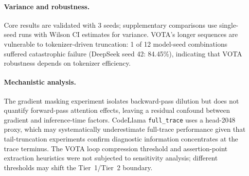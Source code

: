 \documentclass[11pt,a4paper]{article}
\begin{document}
\paragraph{Variance and robustness.}
Core results are validated with 3 seeds; supplementary comparisons use single-seed runs with Wilson CI estimates for variance.
VOTA's longer sequences are vulnerable to tokenizer-driven truncation: 1 of 12 model-seed combinations suffered catastrophic failure (DeepSeek seed 42: 84.45\%), indicating that VOTA robustness depends on tokenizer efficiency.

\paragraph{Mechanistic analysis.}
The gradient masking experiment isolates backward-pass dilution but does not quantify forward-pass attention effects, leaving a residual confound between gradient and inference-time factors.
CodeLlama \texttt{full\_trace} uses a head-2048 proxy, which may systematically underestimate full-trace performance given that tail-truncation experiments confirm diagnostic information concentrates at the trace terminus.
The VOTA loop compression threshold and assertion-point extraction heuristics were not subjected to sensitivity analysis; different thresholds may shift the Tier~1/Tier~2 boundary.



\appendix

\end{document}
